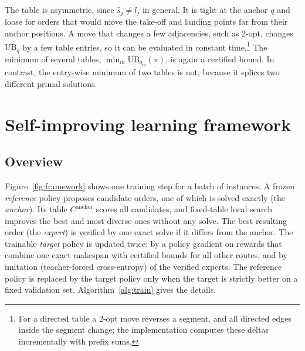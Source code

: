 \documentclass[preprint,review,12pt,authoryear]{elsarticle}
\newcommand{\UB}{\mathrm{UB}}
\begin{document}
The table is asymmetric, since $\hat s_j\neq\hat l_j$ in general. It is tight at the anchor $q$ and loose for
orders that would move the take-off and landing points far from their anchor positions. A move that changes
a few adjacencies, such as 2-opt, changes $\UB_q$ by a few table entries, so it can be evaluated in constant
time.\footnote{For a directed table a 2-opt move reverses a segment, and all directed edges inside the segment
change; the implementation computes these deltas incrementally with prefix sums.} The minimum of
several tables, $\min_m \UB_{q_m}(\pi)$, is again a certified bound. In contrast, the entry-wise minimum of two
tables is not, because it splices two different primal solutions.

\section{Self-improving learning framework}\label{sec:method}

\subsection{Overview}
Figure~\ref{fig:framework} shows one training step for a batch of instances. A frozen \emph{reference} policy
proposes candidate orders, one of which is solved exactly (the \emph{anchor}). Its table $C^{\text{anchor}}$
scores all candidates, and fixed-table local search improves the best and most diverse ones without any solve.
The best resulting order (the \emph{expert}) is verified by one exact solve if it differs from the anchor.
The trainable \emph{target} policy is updated twice: by a policy gradient on rewards that combine one exact
makespan with certified bounds for all other routes, and by imitation (teacher-forced cross-entropy) of the
verified experts. The reference policy is replaced by the target policy only when the target is strictly better on a
fixed validation set. Algorithm~\ref{alg:train} gives the details.
\end{document}
